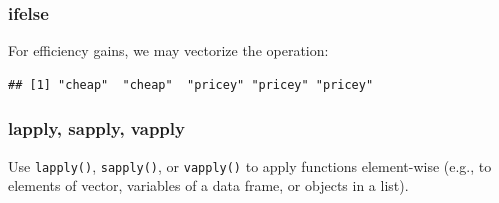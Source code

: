\documentclass[
  11pt,
]{article}
\newenvironment{Shaded}{\begin{snugshade}}{\end{snugshade}}
\newcommand{\ConstantTok}[1]{\textcolor[rgb]{0.00,0.00,0.00}{#1}}
\newcommand{\ControlFlowTok}[1]{\textcolor[rgb]{0.13,0.29,0.53}{\textbf{#1}}}
\newcommand{\DocumentationTok}[1]{\textcolor[rgb]{0.56,0.35,0.01}{\textbf{\textit{#1}}}}
\newcommand{\FloatTok}[1]{\textcolor[rgb]{0.00,0.00,0.81}{#1}}
\newcommand{\FunctionTok}[1]{\textcolor[rgb]{0.00,0.00,0.00}{#1}}
\newcommand{\NormalTok}[1]{#1}
\newcommand{\OtherTok}[1]{\textcolor[rgb]{0.56,0.35,0.01}{#1}}
\newcommand{\SpecialCharTok}[1]{\textcolor[rgb]{0.00,0.00,0.00}{#1}}
\newcommand{\StringTok}[1]{\textcolor[rgb]{0.31,0.60,0.02}{#1}}
\begin{document}
\begin{Shaded}
\end{Shaded}

\hypertarget{ifelse}{%
\subsubsection{ifelse}\label{ifelse}}

For efficiency gains, we may vectorize the operation:

\begin{Shaded}
\end{Shaded}

\begin{verbatim}
## [1] "cheap"  "cheap"  "pricey" "pricey" "pricey"
\end{verbatim}

\hypertarget{lapply-sapply-vapply}{%
\subsubsection{lapply, sapply, vapply}\label{lapply-sapply-vapply}}

Use \texttt{lapply()}, \texttt{sapply()}, or \texttt{vapply()} to apply functions element-wise (e.g., to elements of vector, variables of a data frame, or objects in a list).
\end{document}
